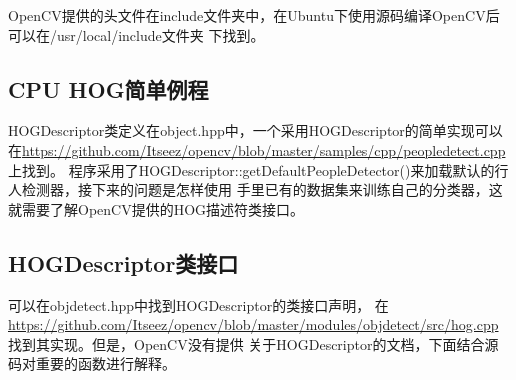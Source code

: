 \documentclass[10pt,technote,onecolumn,twoside]{IEEEtran}
\begin{document}
OpenCV提供的头文件在\textsf{include}文件夹中，在Ubuntu下使用源码编译OpenCV后可以在\textsf{/usr/local/include}文件夹
下找到。
\subsection{CPU HOG简单例程}
\textsf{HOGDescriptor}类定义在\textsf{object.hpp}中，一个采用\textsf{HOGDescriptor}的简单实现可以
在\url{https://github.com/Itseez/opencv/blob/master/samples/cpp/peopledetect.cpp}上找到。
程序采用了\textsf{HOGDescriptor::getDefaultPeopleDetector()}来加载默认的行人检测器，接下来的问题是怎样使用
手里已有的数据集来训练自己的分类器，这就需要了解OpenCV提供的HOG描述符类接口。

\subsection{HOGDescriptor类接口}
可以在\textsf{objdetect.hpp}中找到\textsf{HOGDescriptor}的类接口声明，
在\url{https://github.com/Itseez/opencv/blob/master/modules/objdetect/src/hog.cpp}找到其实现。但是，OpenCV没有提供
关于HOGDescriptor的文档，下面结合源码对重要的函数进行解释。
\end{document}
